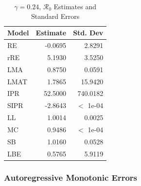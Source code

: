 \documentclass[12pt]{article}
\newcommand{\rr}{\ensuremath{\mathcal{R}_0}}
\begin{document}
\begin{table}[H]
	
	\centering
	\begin{tabular}[t]{l|r|r}
		\hline
		Model & Estimate & Std. Dev\\
		\hline
		RE & -0.0695 & 2.8291\\
		\hline
		rRE & 5.1930 & 3.5250\\
		\hline
		LMA & 0.8750 & 0.0591\\
		\hline
		LMAT & 1.7865 & 15.9420\\
		\hline
		IPR & 52.5000 & 740.0182\\
		\hline
		SIPR & -2.8643 & $<$ 1e-04\\
		\hline
		LL & 1.0014 & 0.0025\\
		\hline
		MC & 0.9486 & $<$ 1e-04\\
		\hline
		SB & 1.0160 & 0.0528\\
		\hline
		LBE & 0.5765 & 5.9119 \\
		\hline
	\end{tabular}
	\caption{$\gamma = 0.24$, $\rr$ Estimates and Standard Errors}
\end{table}

\subsubsection{Autoregressive Monotonic Errors}
\end{document}
